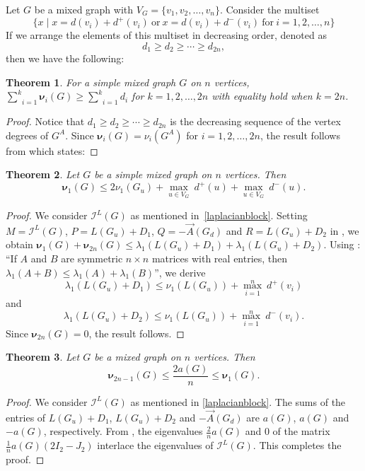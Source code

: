 \documentclass[12pt]{article}
\numberwithin{equation}{section}
\newtheorem{thm}{Theorem}[section]
\begin{document}
	Let $G$ be a mixed graph with $V_G=\{v_1,v_2,\ldots,v_n\}$. Consider the multiset $$\{x\mid x=d(v_i)+d^+(v_i) ~\text{or}~ x=d(v_i)+d^-(v_i) ~\text{for}~i=1,2,\ldots,n\}$$ If we arrange the elements of this multiset in decreasing order, denoted as $$d_1\geq d_2\geq \cdots\geq d_{2n},$$ then we have the following:
	\begin{thm}
		For a simple mixed graph $G$ on $n$ vertices, $\underset{i=1}{\overset{k}{\sum}}\bm{\nu}_i(G)\geq\underset{i=1}{\overset{k}{\sum}}d_i$ for $k=1,2,\ldots,2n$ with equality hold when $k=2n$.
	\end{thm}
	\begin{proof}
		Notice that $d_1\geq d_2\geq \cdots\geq d_{2n}$ is the decreasing sequence of the vertex degrees of $G^A$. 
		Since $\bm{\nu}_i(G)=\nu_i(G^A)$ for $i=1,2,\ldots,2n$, 	 the result follows from \cite[Theorem~7.1.3]{cvetkovic} which states: 
	\end{proof}
	
	\begin{thm}\label{thm-Laplacian}
		Let $G$ be a simple mixed graph on $n$ vertices. Then $$\bm{\nu}_1(G)\leq 2\nu_1(G_u)+\underset{u\in V_G}{\max}~d^+(u)+\underset{u\in V_G}{\max}~d^-(u).$$
	\end{thm}
	\begin{proof}
		 We consider $\mathcal{I}^L(G)$ as mentioned in~\eqref{laplacianblock}.
		Setting $M=\mathcal{I}^L(G)$, $P=L(G_u)+D_1$, $Q=-\vec{A}(G_d)$ and $R=L(G_u)+D_2$ in \cite[Proposition~1.3.16]{cvetkovic}, we obtain $\bm{\nu}_1(G)+\bm{\nu}_{2n}(G)\leq \lambda_1(L(G_u)+D_1)+\lambda_1(L(G_u)+D_2)$.
	Using \cite[Lemma~3.19]{bapatbook}: ``If $A$ and $B$ are symmetric $n\times n$ matrices with real entries, then $\lambda_1(A+B)\leq\lambda_1(A)+\lambda_1(B)$'', we derive $$\displaystyle\lambda_1(L(G_u)+D_1)\leq \nu_1(L(G_u))+\underset{i=1}{\overset{n}{\max}}~d^+(v_i)$$ and $$\displaystyle\lambda_1(L(G_u)+D_2)\leq \nu_1(L(G_u))+\underset{i=1}{\overset{n}{\max}}~d^-(v_i).$$ Since $\bm{\nu}_{2n}(G)=0$, the result follows.
	\end{proof}
	
	\begin{thm}
		Let $G$ be a mixed graph on $n$ vertices. Then $$\bm{\nu}_{2n-1}(G)\leq\displaystyle\frac{2a(G)}{n}\leq\bm{\nu}_1(G).$$
	\end{thm}
	\begin{proof}
		We consider $\mathcal{I}^L(G)$ as mentioned in \eqref{laplacianblock}.
		The sums of the entries of $L(G_u)+D_1$, $L(G_u)+D_2$ and $-\vec{A}(G_d)$ are $a(G)$, $a(G)$ and $-a(G)$, respectively. From \cite[Corollary~1.3.13]{cvetkovic}, the eigenvalues $\frac{2}{n}a(G)$ and $0$ of the matrix $\frac{1}{n}a(G)(2I_2-J_2)$  interlace the eigenvalues of $\mathcal{I}^L(G)$. This completes the proof.
	\end{proof}
	
\end{document}
